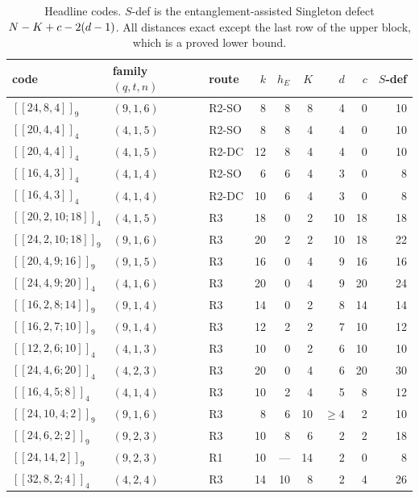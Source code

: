 \begin{table}[t]
\centering
\caption{Headline codes. $S$-def is the entanglement-assisted Singleton defect
$N-K+c-2(d-1)$. All distances exact except the last row of the upper
block, which is a proved lower bound.}
\label{tab:headline}
\small
\begin{tabular}{@{}lllrrrrrr@{}}
\toprule
code & family $(q,t,n)$ & route & $k$ & $h_E$ & $K$ & $d$ & $c$ & $S$-def\\
\midrule
$[[24,8,4]]_9$     & $(9,1,6)$ & R2-SO & 8  & 8 & 8  & 4  & 0  & 10\\
$[[20,4,4]]_4$     & $(4,1,5)$ & R2-SO & 8  & 8 & 4  & 4  & 0  & 10\\
$[[20,4,4]]_4$     & $(4,1,5)$ & R2-DC & 12 & 8 & 4  & 4  & 0  & 10\\
$[[16,4,3]]_4$     & $(4,1,4)$ & R2-SO & 6  & 6 & 4  & 3  & 0  & 8\\
$[[16,4,3]]_4$     & $(4,1,4)$ & R2-DC & 10 & 6  & 4 & 3  & 0  & 8\\
$[[20,2,10;18]]_4$ & $(4,1,5)$ & R3    & 18 & 0 & 2  & 10 & 18 & 18\\
$[[24,2,10;18]]_9$ & $(9,1,6)$ & R3    & 20 & 2 & 2  & 10 & 18 & 22\\
$[[20,4,9;16]]_9$  & $(9,1,5)$ & R3    & 16 & 0 & 4  & 9  & 16 & 16\\
$[[24,4,9;20]]_4$  & $(4,1,6)$ & R3    & 20 & 0 & 4  & 9  & 20 & 24\\
$[[16,2,8;14]]_9$  & $(9,1,4)$ & R3    & 14 & 0 & 2  & 8  & 14 & 14\\
$[[16,2,7;10]]_9$  & $(9,1,4)$ & R3    & 12 & 2 & 2  & 7  & 10 & 12\\
$[[12,2,6;10]]_4$  & $(4,1,3)$ & R3    & 10 & 0 & 2  & 6  & 10 & 10\\
$[[24,4,6;20]]_4$  & $(4,2,3)$ & R3    & 20 & 0 & 4  & 6  & 20 & 30\\
$[[16,4,5;8]]_4$   & $(4,1,4)$ & R3    & 10 & 2 & 4  & 5  & 8  & 12\\
$[[24,10,4;2]]_9$  & $(9,1,6)$ & R3    & 8  & 6 & 10 & $\ge4$ & 2 & 10\\
\midrule
$[[24,6,2;2]]_9$   & $(9,2,3)$ & R3 & 10 & 8  & 6 & 2 & 2 & 18\\
$[[24,14,2]]_9$    & $(9,2,3)$ & R1 & 10 & --- & 14 & 2 & 0 & 8\\
$[[32,8,2;4]]_4$   & $(4,2,4)$ & R3 & 14 & 10 & 8 & 2 & 4 & 26\\
\bottomrule
\end{tabular}
\end{table}

